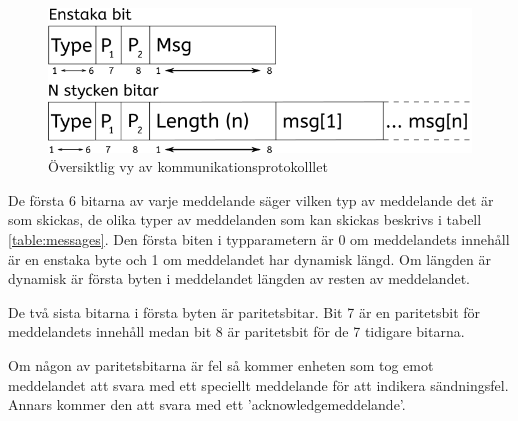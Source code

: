 \documentclass[a4paper,titlepage,12pt]{article}
\begin{document}
	\begin{figure}[h]
		\centering
		\includegraphics[width=0.5\linewidth]{images/communication_protocol1.png}
		\caption{Översiktlig vy av kommunikationsprotokolllet}
		\label{fig:kommunikation1}
	\end{figure}

	De första 6 bitarna av varje meddelande säger vilken typ av meddelande det är som
	skickas, de olika typer av meddelanden som kan skickas beskrivs i tabell 
	\ref{table:messages}. Den första biten i typparametern är 0 om meddelandets
	innehåll är en enstaka byte och 1 om meddelandet har dynamisk längd. Om längden
	är dynamisk är första byten i meddelandet längden av resten av meddelandet.

	De två sista bitarna i första byten är paritetsbitar. Bit 7 är en  paritetsbit
	för meddelandets innehåll medan bit 8 är paritetsbit för de 7 tidigare bitarna.

	Om någon av paritetsbitarna är fel så kommer enheten som tog emot meddelandet att svara
	med ett speciellt meddelande för att indikera sändningsfel. Annars kommer den 
	att svara med ett 'acknowledgemeddelande'.
\end{document}
